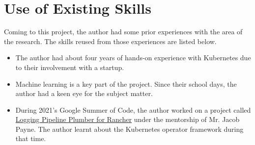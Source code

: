 \section{Use of Existing Skills}

Coming to this project, the author had some prior experiences with the area of the research. The skills reused from those experiences are listed below.

\begin{itemize}[noitemsep,nolistsep]
    \item The author had about four years of hands-on experience with Kubernetes due to their involvement with a startup.
    \item Machine learning is a key part of the project. Since their school days, the author had a keen eye for the subject matter.
    \item During 2021's Google Summer of Code, the author worked on a project called \href{https://github.com/MrSupiri/rancher-logging-pipeline-plumber}{Logging Pipeline Plumber for Rancher} under the mentorship of Mr. Jacob Payne. The author learnt about the Kubernetes operator framework during that time.
\end{itemize}